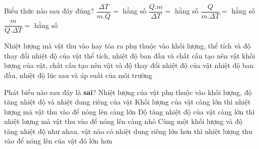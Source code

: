 \begin{ex} 
	Biểu thức nào sau đây đúng?
	\choice
	{$\dfrac{\Delta T}{m . Q}=$ hằng số}
	{$\dfrac{Q.m}{\Delta T}=$ hằng số}
	{\True $\dfrac{Q}{m . \Delta T}=$ hằng số}
	{$\dfrac{m}{Q . \Delta T}=$ hằng số}
\end{ex}
\begin{ex}
	Nhiệt lượng mà vật thu vào hay tỏa ra phụ thuộc vào
	\choice
	{khối lượng, thể tích và độ thay đổi nhiệt độ của vật}
	{thể tích, nhiệt độ ban đầu và chất cấu tạo nên vật}
	{\True khối lượng của vật, chất cấu tạo nên vật và độ thay đổi nhiệt độ của vật}
	{nhiệt độ ban đầu, nhiệt độ lúc sau và áp suất của môi trường}
	\end{ex}

\begin{ex} 
	Phát biểu nào sau đây là \textbf{sai}?
	\choice
	{Nhiệt lượng của vật phụ thuộc vào khối lượng, độ tăng nhiệt độ và nhiệt dung riêng của vật}
	{Khối lượng của vật càng lớn thì nhiệt lượng mà vật thu vào để nóng lên càng lớn}
	{\True Độ tăng nhiệt độ của vật càng lớn thì nhiệt lượng mà vật thu vào để nóng lên càng nhỏ}
	{Cùng một khối lượng và độ tăng nhiệt độ như nhau, vật nào có nhiệt dung riêng lớn hơn thì nhiệt lượng thu vào để nóng lên của vật đó lớn hơn}
\end{ex}


